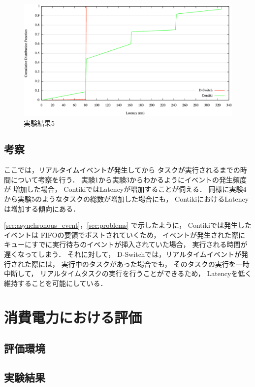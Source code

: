 \begin{figure}[htbp]
 \begin{center}
  \includegraphics[width=120mm]{./images/cdf5.eps}
 \end{center}
 \caption{実験結果5}
 \label{fig:cdf5}
\end{figure}


\subsection{考察}\label{sec:rt_discussion}
ここでは，リアルタイムイベントが発生してから
タスクが実行されるまでの時間について考察を行う．
実験1から実験3からわかるようにイベントの発生頻度が
増加した場合，
ContikiではLatencyが増加することが伺える．
同様に実験4から実験5のようなタスクの総数が増加した場合にも，
ContikiにおけるLatencyは増加する傾向にある．

\ref{sec:asynchronous_event}，\ref{sec:problems}
で示したように，
Contikiでは発生したイベントは
FIFOの要領でポストされていくため，
イベントが発生された際に
キューにすでに実行待ちのイベントが挿入されていた場合，
実行される時間が遅くなってしまう．
それに対して，
D-Switchでは，リアルタイムイベントが発行された際には，
実行中のタスクがあった場合でも，
そのタスクの実行を一時中断して，
リアルタイムタスクの実行を行うことができるため，
Latencyを低く維持することを可能にしている．


\section{消費電力における評価}

\subsection{評価環境}


\subsection{実験結果}


